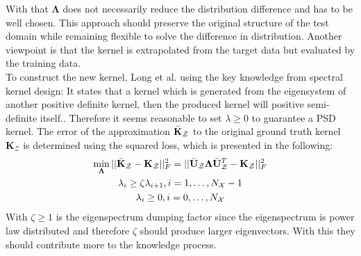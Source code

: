 With that $\boldsymbol{\Lambda}$ does not necessarily reduce the distribution difference and has to be well chosen.
This approach should preserve the original structure of the test domain while remaining flexible to solve the difference in distribution.
Another viewpoint is that the kernel is extrapolated from the target data but evaluated by the training data.\cite{Long.2015}\\
To construct the new kernel, Long et al. using the key knowledge from spectral kernel design:
It states that a kernel which is generated from the eigensystem of another positive definite kernel, then the produced kernel will positive semi-definite itself.\cite{KaiZhang.2013}.
Therefore it seems reasonable to set $\lambda \ge 0$ to guarantee a \acs{PSD} kernel.
The error of the approximation $\bar{\mathbf{K}}_\mathcal{Z}$ to the original ground truth kernel $\mathbf{K}_\mathcal{Z}$ is determined using the squared loss, which is presented in the following:\cite{Long.2015}
\begin{equation}\label{EqTKLSquareErrorLoss}
	\begin{gathered}
		\min_{\boldsymbol{\Lambda}} || \bar{\mathbf{K}}_\mathcal{Z} - \mathbf{K}_\mathcal{Z}||^2_F = || \bar{\mathbf{U}}_\mathcal{Z} \boldsymbol{\Lambda}  \bar{\mathbf{U}}_\mathcal{Z}^T - \mathbf{K}_\mathcal{Z} ||^2_F \\
		\lambda_i \ge \zeta \lambda_{i+1}, i = 1,\dots,N_\mathcal{X}-1 \\
		\lambda_i \ge 0,  i = 0,\dots,N_\mathcal{X}
	\end{gathered}
\end{equation}
With $\zeta \ge 1$ is the eigenspectrum dumping factor since the eigenspectrum is power law distributed and therefore $\zeta$ should produce larger eigenvectors.
With this they should contribute more to the knowledge process.\cite{Long.2015}

